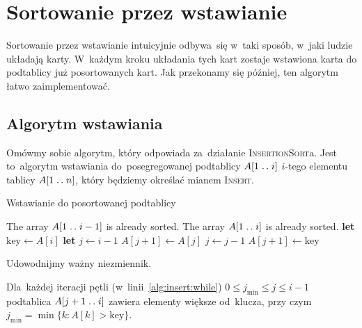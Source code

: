 \section{Sortowanie przez wstawianie}

Sortowanie przez wstawianie intuicyjnie odbywa~się w~taki sposób,
w~jaki ludzie układają karty. W~każdym kroku układania tych kart 
zostaje wstawiona karta do podtablicy już posortowanych kart.
Jak przekonamy się później, ten algorytm łatwo zaimplementować.

\subsection{Algorytm wstawiania}
Omówmy sobie algorytm, który odpowiada za~działanie 
\textsc{InsertionSort}a. Jest to~algorytm wstawiania 
do~posegregowanej podtablicy \( A[1 \mathrel{{.}\,{.}}\nobreak i] \) \(i\)-tego elementu
tablicy \(A[1 \mathrel{{.}\,{.}}\nobreak n]\), który będziemy określać
mianem \textsc{Insert}. 
\begin{algorithm}%
    \label{alg:insert}
    \caption{Wstawianie do posortowanej podtablicy}
    \begin{algorithmic}[1]
        \Require The array \( A[1 \mathrel{{.}\,{.}}\nobreak i - 1] \) is already sorted.
        \Ensure The array \( A[1 \mathrel{{.}\,{.}}\nobreak i] \) is already sorted.
            \State \textbf{let} \( \text{key} \gets A[i]\)
            \State \textbf{let} \( j \gets i - 1 \)
            \label{alg:insert:while}
                \State \( A[j + 1] \gets A[j] \)
                \State \( j \gets j - 1 \)
            \EndWhile
            \State \( A[j + 1] \gets \text{key} \)
        \EndProcedure%
    \end{algorithmic}
\end{algorithm}
Udowodnijmy ważny niezmiennik.
\begin{invariant}\label{inv:insert}
    Dla~każdej iteracji pętli (w~linii~\ref{alg:insert:while})
    \( 0 \le j_{\text{min}} \le j \le i - 1 \) podtablica \( A[ j + 1 \mathrel{{.}\,{.}}\nobreak i] \)
    zawiera elementy większe od~klucza,
    przy czym \( j_{\text{min}} = \min \{ k : A[k] > \text{key} \} \).
\end{invariant}
